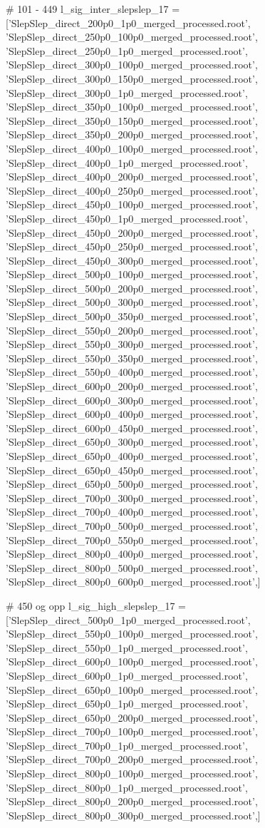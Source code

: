 # 101 - 449
l_sig_inter_slepslep_17 = ['SlepSlep_direct_200p0_1p0_merged_processed.root',
'SlepSlep_direct_250p0_100p0_merged_processed.root',
'SlepSlep_direct_250p0_1p0_merged_processed.root',
'SlepSlep_direct_300p0_100p0_merged_processed.root',
'SlepSlep_direct_300p0_150p0_merged_processed.root',
'SlepSlep_direct_300p0_1p0_merged_processed.root',
'SlepSlep_direct_350p0_100p0_merged_processed.root',
'SlepSlep_direct_350p0_150p0_merged_processed.root',
'SlepSlep_direct_350p0_200p0_merged_processed.root',
'SlepSlep_direct_400p0_100p0_merged_processed.root',
'SlepSlep_direct_400p0_1p0_merged_processed.root',
'SlepSlep_direct_400p0_200p0_merged_processed.root',
'SlepSlep_direct_400p0_250p0_merged_processed.root',
'SlepSlep_direct_450p0_100p0_merged_processed.root',
'SlepSlep_direct_450p0_1p0_merged_processed.root',
'SlepSlep_direct_450p0_200p0_merged_processed.root',
'SlepSlep_direct_450p0_250p0_merged_processed.root',
'SlepSlep_direct_450p0_300p0_merged_processed.root',
'SlepSlep_direct_500p0_100p0_merged_processed.root',
'SlepSlep_direct_500p0_200p0_merged_processed.root',
'SlepSlep_direct_500p0_300p0_merged_processed.root',
'SlepSlep_direct_500p0_350p0_merged_processed.root',
'SlepSlep_direct_550p0_200p0_merged_processed.root',
'SlepSlep_direct_550p0_300p0_merged_processed.root',
'SlepSlep_direct_550p0_350p0_merged_processed.root',
'SlepSlep_direct_550p0_400p0_merged_processed.root',
'SlepSlep_direct_600p0_200p0_merged_processed.root',
'SlepSlep_direct_600p0_300p0_merged_processed.root',
'SlepSlep_direct_600p0_400p0_merged_processed.root',
'SlepSlep_direct_600p0_450p0_merged_processed.root',
'SlepSlep_direct_650p0_300p0_merged_processed.root',
'SlepSlep_direct_650p0_400p0_merged_processed.root',
'SlepSlep_direct_650p0_450p0_merged_processed.root',
'SlepSlep_direct_650p0_500p0_merged_processed.root',
'SlepSlep_direct_700p0_300p0_merged_processed.root',
'SlepSlep_direct_700p0_400p0_merged_processed.root',
'SlepSlep_direct_700p0_500p0_merged_processed.root',
'SlepSlep_direct_700p0_550p0_merged_processed.root',
'SlepSlep_direct_800p0_400p0_merged_processed.root',
'SlepSlep_direct_800p0_500p0_merged_processed.root',
'SlepSlep_direct_800p0_600p0_merged_processed.root',]
    
# 450 og opp
l_sig_high_slepslep_17 = ['SlepSlep_direct_500p0_1p0_merged_processed.root',
'SlepSlep_direct_550p0_100p0_merged_processed.root',
'SlepSlep_direct_550p0_1p0_merged_processed.root',
'SlepSlep_direct_600p0_100p0_merged_processed.root',
'SlepSlep_direct_600p0_1p0_merged_processed.root',
'SlepSlep_direct_650p0_100p0_merged_processed.root',
'SlepSlep_direct_650p0_1p0_merged_processed.root',
'SlepSlep_direct_650p0_200p0_merged_processed.root',
'SlepSlep_direct_700p0_100p0_merged_processed.root',
'SlepSlep_direct_700p0_1p0_merged_processed.root',
'SlepSlep_direct_700p0_200p0_merged_processed.root',
'SlepSlep_direct_800p0_100p0_merged_processed.root',
'SlepSlep_direct_800p0_1p0_merged_processed.root',
'SlepSlep_direct_800p0_200p0_merged_processed.root',
'SlepSlep_direct_800p0_300p0_merged_processed.root',]


